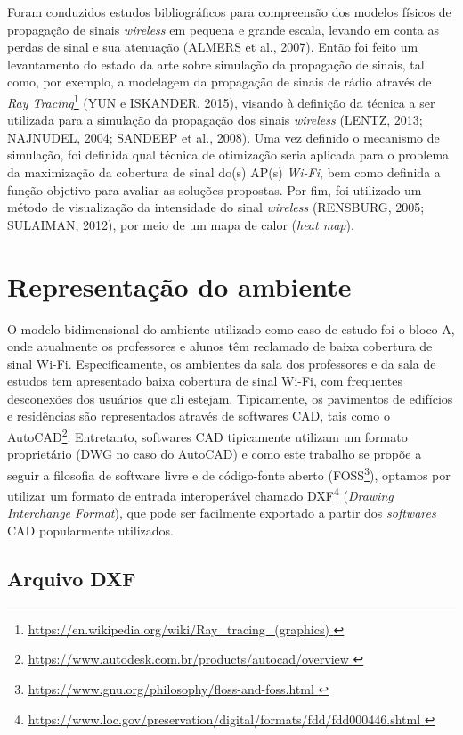 \documentclass[
	12pt,				%
	openright,			%
	twoside,			%
	a4paper,			%
	english,			%
	french,				%
	spanish,			%
	brazil				%
	]{abntex2}
\begin{document}
Foram conduzidos estudos bibliográficos para compreensão dos modelos físicos de propagação de sinais \textit{wireless} em pequena e grande escala, levando em conta as perdas de sinal e sua atenuação (ALMERS et al., 2007). Então foi feito um levantamento do estado da arte sobre simulação da propagação de sinais, tal como, por exemplo, a modelagem da propagação de sinais de rádio através de \textit{Ray Tracing}\footnote{\url{https://en.wikipedia.org/wiki/Ray_tracing_(graphics) }} (YUN e ISKANDER, 2015), visando à definição da técnica a ser utilizada para a simulação da propagação dos sinais \textit{wireless} (LENTZ, 2013; NAJNUDEL, 2004; SANDEEP et al., 2008). Uma vez definido o mecanismo de simulação, foi definida qual técnica de otimização seria aplicada para o problema da maximização da cobertura de sinal do(s) AP(s) \textit{Wi-Fi}, bem como definida a função objetivo para avaliar as soluções propostas. Por fim, foi utilizado um método de visualização da intensidade do sinal \textit{wireless} (RENSBURG, 2005; SULAIMAN, 2012), por meio de um mapa de calor (\textit{heat map}).


\section[Representação do ambiente]{Representação do ambiente}

O modelo bidimensional do ambiente utilizado como caso de estudo foi o bloco A, onde atualmente os professores e alunos têm reclamado de baixa cobertura de sinal Wi-Fi. Especificamente, os ambientes da sala dos professores e da sala de estudos tem apresentado baixa cobertura de sinal Wi-Fi, com frequentes desconexões dos usuários que ali estejam. Tipicamente, os pavimentos de edifícios e residências são representados através de softwares CAD, tais como o AutoCAD\footnote{\url{https://www.autodesk.com.br/products/autocad/overview }}. Entretanto, softwares CAD tipicamente utilizam um formato proprietário (DWG no caso do AutoCAD) e como este trabalho se propõe a seguir a filosofia de software livre e de código-fonte aberto (FOSS\footnote{\url{https://www.gnu.org/philosophy/floss-and-foss.html }}), optamos por utilizar um formato de entrada interoperável chamado DXF\footnote{\url{https://www.loc.gov/preservation/digital/formats/fdd/fdd000446.shtml }} (\textit{Drawing Interchange Format}), que pode ser facilmente exportado a partir dos \textit{softwares} CAD popularmente utilizados.

\subsection[Arquivo DXF]{Arquivo DXF}
\end{document}
